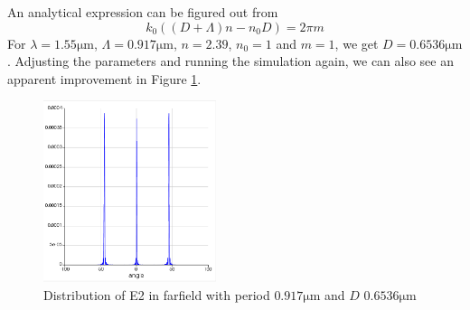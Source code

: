 \documentclass[fontsize=11pt]{scrartcl}
\begin{document}
An analytical expression can be figured out from
\begin{equation}
    k_{0}\left((D+\Lambda) n-n_{0} D\right)=2 \pi m
\end{equation}
For $\lambda=1.55\mathrm{\mu m}$, $\Lambda=0.917\mathrm{\mu m}$, 
$n=2.39$, $n_0=1$ and $m=1$, we get $D=0.6536\mathrm{\mu m}$. 
Adjusting the parameters and running the simulation again, 
we can also see an apparent improvement in Figure \ref{fig1.6}.
\begin{figure}[H]
    \centering
     \includegraphics[width=0.45\textwidth]{img/fig1.6.png}
     \caption{Distribution of E2 in farfield with 
     period $0.917\mathrm{\mu m}$ and $D$ $0.6536\mathrm{\mu m}$}
     \label{fig1.6}
\end{figure}


\pagebreak
\end{document}
